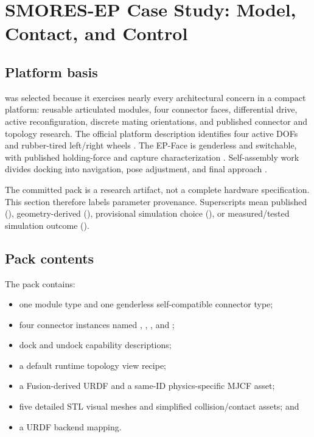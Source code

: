 \section{SMORES-EP Case Study: Model, Contact, and Control}
\label{sec:smores}

\subsection{Platform basis}

\smoresep{} was selected because it exercises nearly every architectural concern in a
compact platform: reusable articulated modules, four connector faces, differential
drive, active reconfiguration, discrete mating orientations, and published connector
and topology research. The official platform description identifies four active DOFs
and rubber-tired left/right wheels \citep{modlabSmoresEp}. The EP-Face is genderless and
switchable, with published holding-force and capture characterization
\citep{tosun2016epface}. Self-assembly work divides docking into navigation, pose
adjustment, and final approach \citep{liu2020parallel,liu2023smoresep}.

The committed pack is a research artifact, not a complete hardware specification. This
section therefore labels parameter provenance. Superscripts mean published
(\sourcefact{}), geometry-derived (\cadfact{}), provisional simulation choice
(\simchoice{}), or measured/tested simulation outcome (\measuredfact{}).

\subsection{Pack contents}

The  pack contains:

\begin{itemize}
  \item one module type and one genderless self-compatible connector type;
  \item four connector instances named , , , and
        ;
  \item dock and undock capability descriptions;
  \item a default runtime topology view recipe;
  \item a Fusion-derived URDF and a same-ID physics-specific MJCF asset;
  \item five detailed STL visual meshes and simplified collision/contact assets; and
  \item a URDF backend mapping.
\end{itemize}

